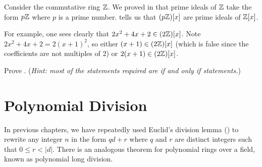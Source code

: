 \begin{example}
    Consider the commutative ring $\mathbb{Z}$. We proved in  that prime ideals of $\mathbb{Z}$ take the form $p\mathbb{Z}$ where $p$ is a prime number.  tells us that $(p\mathbb{Z})[x]$ are prime ideals of $\mathbb{Z}[x]$.

    For example, one sees clearly that $2x^2 + 4x + 2 \in (2\mathbb{Z})[x]$. Note $2x^2 + 4x + 2 = 2(x+1)^2$, so either $(x+1) \in (2\mathbb{Z})[x]$ (which is false since the coefficients are not multiples of 2) or $2(x+1) \in (2\mathbb{Z})[x]$.
\end{example}

\begin{exercise}\label{exercise-prime-ideal-iff-prime-ideal-in-polynomial-ring}
    Prove .\newline
    (\textit{Hint: most of the statements required are if and only if statements.})
\end{exercise}

\section{Polynomial Division}
In previous chapters, we have repeatedly used Euclid's division lemma () to rewrite any integer $n$ in the form $qd + r$ where $q$ and $r$ are distinct integers such that $0 \leq r < |d|$. There is an analogous theorem for polynomial rings over a field, known as polynomial long division.

